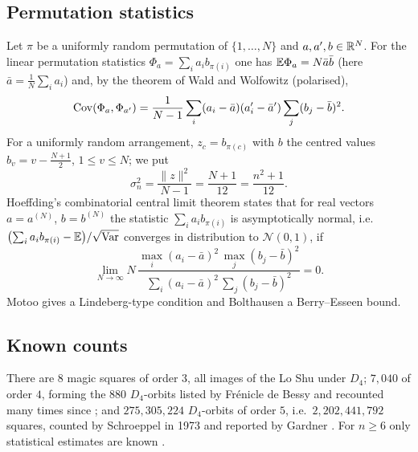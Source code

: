 \subsection{Permutation statistics}
\label{sec:bg_perm}

Let $\pi$ be a uniformly random permutation of $\{1,\dots,N\}$ and $a,a',b\in\mathbb{R}^N$.
For the linear permutation statistics $\Phi_a=\sum_ia_ib_{\pi(i)}$ one has $\mathbb{E}\Phi_a=N\bar a\bar b$ (here $\bar a=\frac1N\sum_ia_i$) and, by the theorem of Wald and Wolfowitz \cite{waldwolfowitz1944,noether1949} (polarised),
\begin{equation}
\mathrm{Cov}(\Phi_a,\Phi_{a'})=\frac{1}{N-1}\sum_i(a_i-\bar a)(a'_i-\bar a')\sum_j(b_j-\bar b)^2 .
\label{eq:ww_identity}
\end{equation}
For a uniformly random arrangement, $z_c=b_{\pi(c)}$ with $b$ the centred values $b_v=v-\frac{N+1}2$, $1\le v\le N$; we put
\begin{equation}
\sigma_n^2=\frac{\|z\|^2}{N-1}=\frac{N+1}{12}=\frac{n^2+1}{12}.
\label{eq:sigma}
\end{equation}
Hoeffding's combinatorial central limit theorem \cite[Thm.~4 and condition~(14), p.~560]{hoeffding1951} states that for real vectors $a=a^{(N)}$, $b=b^{(N)}$ the statistic $\sum_ia_ib_{\pi(i)}$ is asymptotically normal, i.e.\ $\bigl(\sum_ia_ib_{\pi(i)}-\mathbb{E}\bigr)/\sqrt{\mathrm{Var}}$ converges in distribution to $\mathcal N(0,1)$, if
\begin{equation}
\lim_{N\to\infty}N\,\frac{\max_i(a_i-\bar a)^2\,\max_j(b_j-\bar b)^2}{\sum_i(a_i-\bar a)^2\,\sum_j(b_j-\bar b)^2}=0 .
\label{eq:hoeffding_max}
\end{equation}
Motoo \cite{motoo1957} gives a Lindeberg-type condition and Bolthausen \cite{bolthausen1984} a Berry--Esseen bound.

\subsection{Known counts}
\label{sec:bg_polytopes}

There are $8$ magic squares of order $3$, all images of the Lo Shu under $D_4$; $7{,}040$ of order $4$, forming the $880$ $D_4$-orbits listed by Fr\'enicle de Bessy \cite{frenicle1693} and recounted many times since \cite{beck2010enumeration}; and $275{,}305{,}224$ $D_4$-orbits of order $5$, i.e.\ $2{,}202{,}441{,}792$ squares, counted by Schroeppel in 1973 and reported by Gardner \cite{gardner1976}.
For $n\ge6$ only statistical estimates are known \cite{pinn1998number,trump2012enumeration}.

